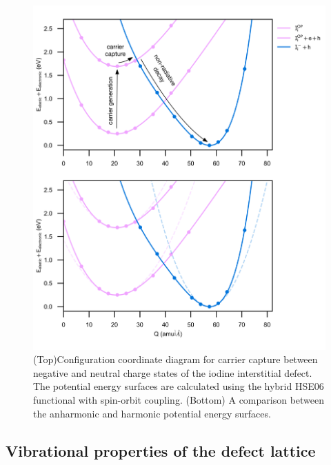  
\begin{figure}[h!]   
\centering
  \includegraphics[width=1.0\columnwidth]{figures/ch6/carrier_capture_digram.png}
  \caption[Configuration coordinate diagram for carrier capture between negative and neutral charge states of the iodine interstitial defect]{(Top)Configuration coordinate diagram for carrier capture between negative and neutral charge states of the iodine interstitial defect. The potential energy surfaces are calculated using the hybrid HSE06 functional with spin-orbit coupling. (Bottom) A comparison between the anharmonic and harmonic potential energy surfaces. }
\label{configuration_coordinate}
\end{figure}


\subsection{Vibrational properties of the defect lattice}

